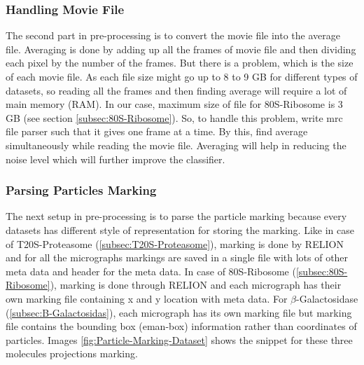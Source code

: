 \documentclass{report}
\begin{document}
\subsubsection{Handling Movie File}
The second part in pre-processing is to convert the movie file into the average file. Averaging is done by adding up all the frames of movie file and then dividing each pixel by the number of the frames. But there is a problem, which is the size of each movie file. As each file size might go up to 8 to 9 GB for different types of datasets, so reading all the frames and then finding average will require a lot of main memory (RAM). In our case, maximum size of file for 80S-Ribosome is 3 GB (see section \ref{subsec:80S-Ribosome}). So, to handle this problem, write mrc file parser such that it gives one frame at a time. By this, find average simultaneously while reading the movie file.  Averaging will help in reducing the noise level which will further improve the classifier.


\subsubsection{Parsing Particles Marking}
The next setup in pre-processing is to parse the particle marking because every datasets has different style of representation for storing the marking. Like in case of T20S-Proteasome (\ref{subsec:T20S-Proteasome}), marking is done by RELION and for all the micrographs markings are saved in a single file with lots of other meta data and header for the meta data. In case of 80S-Ribosome (\ref{subsec:80S-Ribosome}), marking is done through RELION and each micrograph has their own marking file containing x and y location with meta data. For $\beta$-Galactosidase (\ref{subsec:B-Galactosidas}), each micrograph has its own marking file but marking file contains the bounding box (eman-box) information rather than coordinates of particles. Images \ref{fig:Particle-Marking-Dataset} shows the snippet for these three molecules projections marking.
\end{document}
